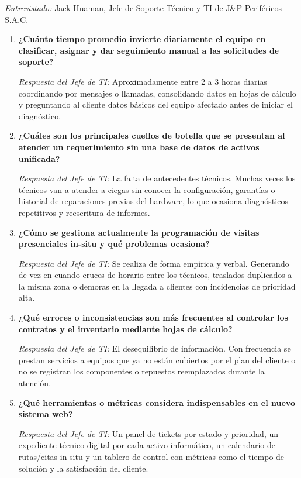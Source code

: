 \clearpage

\vspace{0.3cm}
\noindent\textit{Entrevistado:} Jack Huaman, Jefe de Soporte Técnico y TI de J\&P Periféricos S.A.C.
\vspace{0.4cm}

\begin{enumerate}[leftmargin=*, label=\textbf{P\arabic*.}]
    \item \textbf{¿Cuánto tiempo promedio invierte diariamente el equipo en clasificar, asignar y dar seguimiento manual a las solicitudes de soporte?}
    
    \textit{Respuesta del Jefe de TI:} Aproximadamente entre 2 a 3 horas diarias coordinando por mensajes o llamadas, consolidando datos en hojas de cálculo y preguntando al cliente datos básicos del equipo afectado antes de iniciar el diagnóstico.

    \item \textbf{¿Cuáles son los principales cuellos de botella que se presentan al atender un requerimiento sin una base de datos de activos unificada?}
    
    \textit{Respuesta del Jefe de TI:} La falta de antecedentes técnicos. Muchas veces los técnicos van a atender a ciegas sin conocer la configuración, garantías o historial de reparaciones previas del hardware, lo que ocasiona diagnósticos repetitivos y reescritura de informes.

    \item \textbf{¿Cómo se gestiona actualmente la programación de visitas presenciales in-situ y qué problemas ocasiona?}
    
    \textit{Respuesta del Jefe de TI:} Se realiza de forma empírica y verbal. Generando de vez en cuando cruces de horario entre los técnicos, traslados duplicados a la misma zona o demoras en la llegada a clientes con incidencias de prioridad alta.

    \item \textbf{¿Qué errores o inconsistencias son más frecuentes al controlar los contratos y el inventario mediante hojas de cálculo?}
    
    \textit{Respuesta del Jefe de TI:} El desequilibrio de información. Con frecuencia se prestan servicios a equipos que ya no están cubiertos por el plan del cliente o no se registran los componentes o repuestos reemplazados durante la atención.

    \item \textbf{¿Qué herramientas o métricas considera indispensables en el nuevo sistema web?}
    
    \textit{Respuesta del Jefe de TI:} Un panel de tickets por estado y prioridad, un expediente técnico digital por cada activo informático, un calendario de rutas/citas in-situ y un tablero de control con métricas como el tiempo de solución y la satisfacción del cliente.
\end{enumerate}
